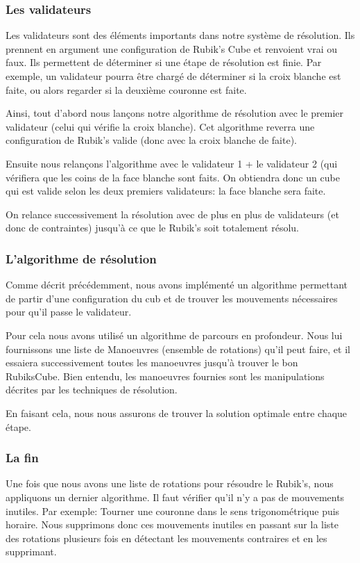 \subsubsection{Les validateurs}
Les validateurs sont des éléments importants dans notre système de résolution.
Ils prennent en argument une configuration de Rubik's Cube et renvoient vrai ou faux.
Ils permettent de déterminer si une étape de résolution est finie.
Par exemple, un validateur pourra être chargé de déterminer si la croix blanche est faite, ou alors regarder si la deuxième couronne est faite.

Ainsi, tout d'abord nous lançons notre algorithme de résolution avec le premier validateur (celui qui vérifie la croix blanche).
Cet algorithme reverra une configuration de Rubik's valide (donc avec la croix blanche de faite).

Ensuite nous relançons l'algorithme avec le validateur 1 + le validateur 2 (qui vérifiera que les coins de la face blanche sont faits.
On obtiendra donc un cube qui est valide selon les deux premiers validateurs: la face blanche sera faite.

On relance successivement la résolution avec de plus en plus de validateurs (et donc de contraintes) jusqu'à ce que le Rubik's soit totalement résolu.

\subsubsection{L'algorithme de résolution}
Comme décrit précédemment, nous avons implémenté un algorithme permettant de partir d'une configuration du cub et de trouver les mouvements nécessaires pour qu'il passe le validateur.

Pour cela nous avons utilisé un algorithme de parcours en profondeur.
Nous lui fournissons une liste de Manoeuvres (ensemble de rotations) qu'il peut faire, et il essaiera successivement toutes les manoeuvres jusqu'à trouver le bon RubiksCube.
Bien entendu, les manoeuvres fournies sont les manipulations décrites par les techniques de résolution.

En faisant cela, nous nous assurons de trouver la solution optimale entre chaque étape.

\subsubsection{La fin}
Une fois que nous avons une liste de rotations pour résoudre le Rubik's, nous appliquons un dernier algorithme.
Il faut vérifier qu'il n'y a pas de mouvements inutiles.
Par exemple: Tourner une couronne dans le sens trigonométrique puis horaire.
Nous supprimons donc ces mouvements inutiles en passant sur la liste des rotations plusieurs fois en détectant les mouvements contraires et en les supprimant.





